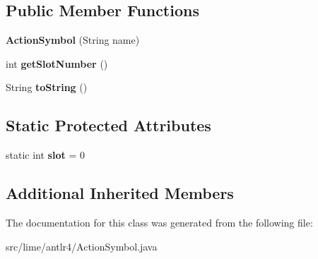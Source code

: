 \subsection*{Public Member Functions}
\begin{DoxyCompactItemize}
\item 
\mbox{\label{classlime_1_1antlr4_1_1ActionSymbol_ad57bb5544fd2c738af25c16059d8ff0b}} 
{\bfseries Action\+Symbol} (String name)
\item 
\mbox{\label{classlime_1_1antlr4_1_1ActionSymbol_a9a452118578a30c3cb31d9cade8cd81f}} 
int {\bfseries get\+Slot\+Number} ()
\item 
\mbox{\label{classlime_1_1antlr4_1_1ActionSymbol_a46ea3400662234b1382164bb38efacda}} 
String {\bfseries to\+String} ()
\end{DoxyCompactItemize}
\subsection*{Static Protected Attributes}
\begin{DoxyCompactItemize}
\item 
\mbox{\label{classlime_1_1antlr4_1_1ActionSymbol_a727c5b49c2845b1158796364ac0d923d}} 
static int {\bfseries slot} = 0
\end{DoxyCompactItemize}
\subsection*{Additional Inherited Members}


The documentation for this class was generated from the following file\+:\begin{DoxyCompactItemize}
\item 
src/lime/antlr4/Action\+Symbol.\+java\end{DoxyCompactItemize}

